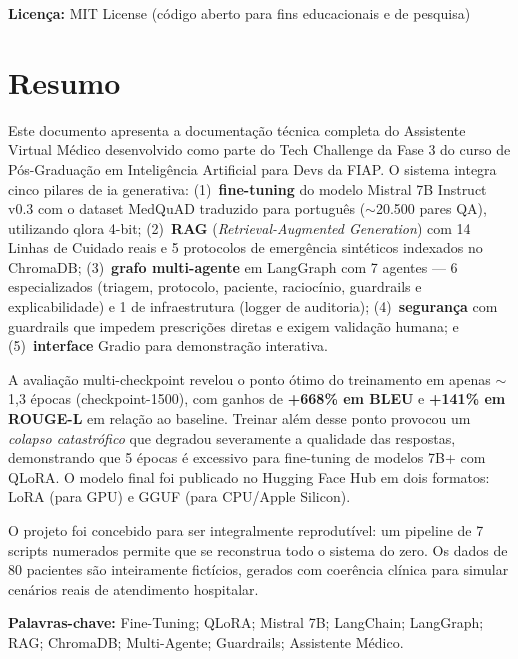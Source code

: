 \documentclass[12pt, a4paper]{report}
\begin{document}
\textbf{Licença:} MIT License (código aberto para fins educacionais e de pesquisa)

\chapter*{Resumo}
\vspace*{-0.3cm}

Este documento apresenta a documentação técnica completa do Assistente Virtual Médico desenvolvido como parte do Tech Challenge da Fase 3 do curso de Pós-Graduação em Inteligência Artificial para Devs da FIAP. O sistema integra cinco pilares de \acrfull{ia} generativa: (1)~\textbf{fine-tuning} do modelo Mistral 7B Instruct v0.3 com o dataset MedQuAD traduzido para português ($\sim$20.500 pares QA), utilizando \acrfull{qlora} 4-bit; (2)~\textbf{RAG} (\textit{Retrieval-Augmented Generation}) com 14 Linhas de Cuidado reais e 5 protocolos de emergência sintéticos indexados no ChromaDB; (3)~\textbf{grafo multi-agente} em LangGraph com 7 agentes --- 6 especializados (triagem, protocolo, paciente, raciocínio, guardrails e explicabilidade) e 1 de infraestrutura (logger de auditoria); (4)~\textbf{segurança} com guardrails que impedem prescrições diretas e exigem validação humana; e (5)~\textbf{interface} Gradio para demonstração interativa.

A avaliação multi-checkpoint revelou o ponto ótimo do treinamento em apenas $\sim$1,3 épocas (checkpoint-1500), com ganhos de \textbf{+668\% em BLEU} e \textbf{+141\% em ROUGE-L} em relação ao baseline. Treinar além desse ponto provocou um \textit{colapso catastrófico} que degradou severamente a qualidade das respostas, demonstrando que 5 épocas é excessivo para fine-tuning de modelos 7B+ com QLoRA. O modelo final foi publicado no Hugging Face Hub em dois formatos: LoRA (para GPU) e GGUF (para CPU/Apple Silicon).

O projeto foi concebido para ser integralmente reprodutível: um pipeline de 7 scripts numerados permite que se reconstrua todo o sistema do zero. Os dados de 80 pacientes são inteiramente fictícios, gerados com coerência clínica para simular cenários reais de atendimento hospitalar.

\vspace{1em}
\noindent\textbf{Palavras-chave:} Fine-Tuning; QLoRA; Mistral 7B; LangChain; LangGraph; RAG; ChromaDB; Multi-Agente; Guardrails; Assistente Médico.
\end{document}
